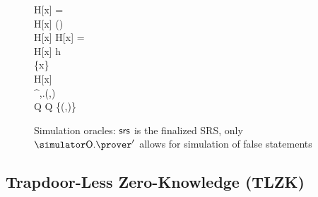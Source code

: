 

\begin{figure}
	\centering
		\begin{pcvstack}
		\begin{pchstack}
			{
			\pcif H[x] = \bot \pcthen \\
			\pcind H[x] \sample {}(\ro) \\
			\pcreturn H[x]
			  }
			\pchspace
			{ 
				\pcif H[x] = \bot \pcthen \\ 
				\pcind H[x] \gets h \\
				\pcind \Qprog \gets \Qprog \cup \{x\}\\
				\pcreturn H[x]
			}
			\pchspace
			{ 
				\boxed{\pcassert (\inp,\wit)\in \REL} \\ 
				\pi \gets \simulator^{\simOH,\simulator\oracleo.\prog}(\srs,\inp)\\
				Q \gets Q \cup \{(\inp,\pi)\}\\
				\pcreturn \pi
			}
		\end{pchstack}
	\end{pcvstack}
	\caption{Simulation oracles: $\mathsf{srs}$ is the finalized SRS, only $\simOP'$ allows for simulation of false statements}
	\label{fig:real_simulator_oracles}
\end{figure}

\subsection{Trapdoor-Less Zero-Knowledge (TLZK)}







